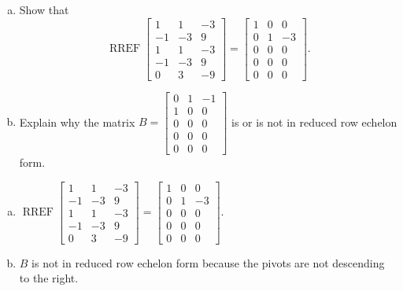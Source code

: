
\begin{exerciseStatement}

\begin{enumerate}[(a)]
\item Show that \[\operatorname{RREF} \left[\begin{array}{ccc}
1 & 1 & -3 \\
-1 & -3 & 9 \\
1 & 1 & -3 \\
-1 & -3 & 9 \\
0 & 3 & -9
\end{array}\right] = \left[\begin{array}{ccc}
1 & 0 & 0 \\
0 & 1 & -3 \\
0 & 0 & 0 \\
0 & 0 & 0 \\
0 & 0 & 0
\end{array}\right] .\]
\item Explain why the matrix \(B= \left[\begin{array}{ccc}
0 & 1 & -1 \\
1 & 0 & 0 \\
0 & 0 & 0 \\
0 & 0 & 0 \\
0 & 0 & 0
\end{array}\right] \) is or is not in reduced row echelon form.
\end{enumerate}
    
\end{exerciseStatement}
    
\begin{exerciseAnswer} 

\begin{enumerate}[(a)]
\item \(\operatorname{RREF} \left[\begin{array}{ccc}
1 & 1 & -3 \\
-1 & -3 & 9 \\
1 & 1 & -3 \\
-1 & -3 & 9 \\
0 & 3 & -9
\end{array}\right] = \left[\begin{array}{ccc}
1 & 0 & 0 \\
0 & 1 & -3 \\
0 & 0 & 0 \\
0 & 0 & 0 \\
0 & 0 & 0
\end{array}\right] .\)
\item \(B\) is not in reduced row echelon form because the pivots are not descending to the right. 
\end{enumerate}
    
\end{exerciseAnswer}
    
